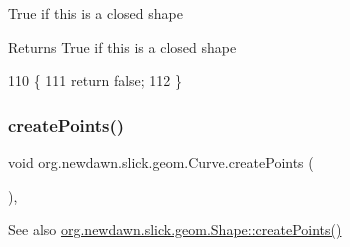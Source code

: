True if this is a closed shape

\begin{DoxyReturn}{Returns}
True if this is a closed shape 
\end{DoxyReturn}

\begin{DoxyCode}
110                             \{
111         \textcolor{keywordflow}{return} \textcolor{keyword}{false};
112     \}
\end{DoxyCode}
\mbox{\label{classorg_1_1newdawn_1_1slick_1_1geom_1_1_curve_a7dceb40e39184563c79b0767d8466bda}} 
\subsubsection{\texorpdfstring{create\+Points()}{createPoints()}}
{\footnotesize\ttfamily void org.\+newdawn.\+slick.\+geom.\+Curve.\+create\+Points (\begin{DoxyParamCaption}{ }\end{DoxyParamCaption})\hspace{0.3cm}{\ttfamily [inline]}, {\ttfamily [protected]}}

\begin{DoxySeeAlso}{See also}
\mbox{\hyperlink{classorg_1_1newdawn_1_1slick_1_1geom_1_1_shape_a2f5907ca87e87f8794161f46389ff8c8}{org.\+newdawn.\+slick.\+geom.\+Shape\+::create\+Points()}} 
\end{DoxySeeAlso}

